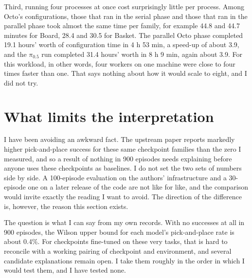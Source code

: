 Third, running four processes at once cost surprisingly little per process. Among Octo's configurations, those that ran in the serial phase and those that ran in the parallel phase took almost the same time per family, for example 44.8 and 44.7 minutes for Board, 28.4 and 30.5 for Basket. The parallel Octo phase completed 19.1 hours' worth of configuration time in 4 h 53 min, a speed-up of about 3.9, and the $\pi_{0.5}$ run completed 31.4 hours' worth in 8 h 9 min, again about 3.9. For this workload, in other words, four workers on one machine were close to four times faster than one. That says nothing about how it would scale to eight, and I did not try.

\section{What limits the interpretation}
\label{sec:version-drift}

I have been avoiding an awkward fact. The upstream paper reports markedly higher pick-and-place success for these same checkpoint families than the zero I measured, and so a result of nothing in 900 episodes needs explaining before anyone uses these checkpoints as baselines. I do not set the two sets of numbers side by side. A 100-episode evaluation on the authors' infrastructure and a 30-episode one on a later release of the code are not like for like, and the comparison would invite exactly the reading I want to avoid. The direction of the difference is, however, the reason this section exists.

The question is what I can say from my own records. With no successes at all in 900 episodes, the Wilson upper bound for each model's pick-and-place rate is about 0.4\%. For checkpoints fine-tuned on these very tasks, that is hard to reconcile with a working pairing of checkpoint and environment, and several candidate explanations remain open. I take them roughly in the order in which I would test them, and I have tested none.


